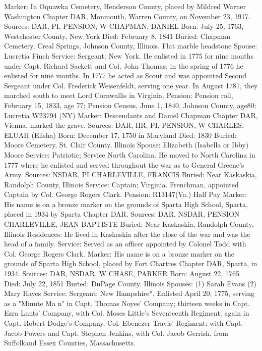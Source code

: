 Marker: In Oquawka Cemetery, Henderson County, placed by Mildred Warner Washington Chapter DAR, Monmouth, Warren County, on November 23, 1917.   
Sources: DAR, PI, PENSION, W 
CHAPMAN, DANIEL 
Born: July 25, 1763, Westchester County, New York 
Died: February 8, 1841 
Buried: Chapman Cemetery, Creal Springs, Johnson County, Illinois. Flat marble headstone 
Spouse: Lucretia Finch 
Service: Sergeant; New York. He enlisted in 1775 for nine months under Capt. Richard Sackett and Col. John Thomas; in the spring of 1776 he enlisted for nine months. In 1777 he acted as Scout and was appointed Second Sergeant under Col. Frederick Weisenfeldt, serving one year. In August 1781, they marched south to meet Lord Cornwallis in Virginia. 
Pension: Pension roll, February 15, 1833, age 77; Pension Census, June 1, 1840, Johnson County, age80; Lucretia W23794 (NY) 
Marker: Descendants and Daniel Chapman Chapter DAR, Vienna, marked the grave. 
Sources: DAR, HR, PI, PENSION, W 
CHARLES, ELUAH (Elisha) 
Born: December 17, 1750 in Maryland 
Died: 1830 
Buried: Moore Cemetery, St. Clair County, Illinois 
Spouse: Elizabeth (Isabella or Ibby) Moore 
Service: Patriotic; Service North Carolina. He moved to North Carolina in 1777 where he enlisted and served throughout the war as to General Greene's Army. 
Sources: NSDAR, PI 
CHARLEVILLE, FRANCIS 
Buried: Near Kaskaskia, Randolph County, Illinois 
Service: Captain; Virginia. Frenchman, appointed Captain by Col. George Rogers Clark. 
Pension: R13147(Va.) Half Pay 
Marker: His name is on a bronze marker on the grounds of Sparta High School, Sparta, placed in 1934 by Sparta Chapter DAR. 
Sources: DAR, NSDAR, PENSION 
CHARLEVILLE, JEAN BAPTISTE 
Buried: Near Kaskaskia, Randolph County, Illinois 
Residences: He lived in Kaskaskia after the close of the war and was the head of a family. 
Service: Served as an officer appointed by Colonel Todd with Col. George Rogers Clark. 
Marker: His name is on a bronze marker on the grounds of Sparta High School, placed by Fort Chartres Chapter DAR, Sparta, in 1934. 
Sources: DAR, NSDAR, W 
CHASE, PARKER 
Born: August 22, 1765 
Died: July 22, 1851 
Buried: DuPage County. Illinois 
Spouses: (1) Sarah Evans	 (2) Mary Hayes 
Service: Sergeant; New Hampshire*, Enlisted April 20, 1775, serving as a "Min­ute Ma n" in Capt. Thomas Noyes' Company; thirteen weeks in Capt. Ezra Lunts' Company, with Col. Moses Little's Seventeenth Regiment; again in Capt. Robert Dodge's Company, Col. Ebenezer Travis' Regiment; with Capt. Jacob Powers and Capt. Stephen Jenkins, with Col. Jacob Gerrish, from Suffolkand Essex Counties, Massachusetts. 
